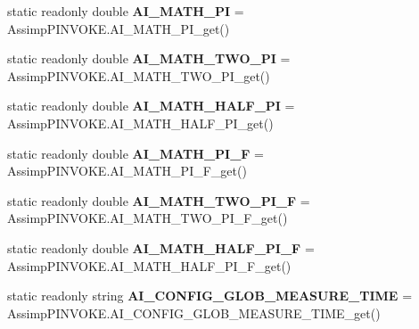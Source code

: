 \begin{DoxyCompactItemize}
\item 
\hypertarget{class_assimp_a6f3351386aca5512768ecf4adff6d544}{static readonly double {\bfseries A\+I\+\_\+\+M\+A\+T\+H\+\_\+\+P\+I} = Assimp\+P\+I\+N\+V\+O\+K\+E.\+A\+I\+\_\+\+M\+A\+T\+H\+\_\+\+P\+I\+\_\+get()}\label{class_assimp_a6f3351386aca5512768ecf4adff6d544}

\item 
\hypertarget{class_assimp_ac58777c0b131a7e12ca4f1249916a5f9}{static readonly double {\bfseries A\+I\+\_\+\+M\+A\+T\+H\+\_\+\+T\+W\+O\+\_\+\+P\+I} = Assimp\+P\+I\+N\+V\+O\+K\+E.\+A\+I\+\_\+\+M\+A\+T\+H\+\_\+\+T\+W\+O\+\_\+\+P\+I\+\_\+get()}\label{class_assimp_ac58777c0b131a7e12ca4f1249916a5f9}

\item 
\hypertarget{class_assimp_a78405f9c4e1cc3b9eb8d9beebdd061a5}{static readonly double {\bfseries A\+I\+\_\+\+M\+A\+T\+H\+\_\+\+H\+A\+L\+F\+\_\+\+P\+I} = Assimp\+P\+I\+N\+V\+O\+K\+E.\+A\+I\+\_\+\+M\+A\+T\+H\+\_\+\+H\+A\+L\+F\+\_\+\+P\+I\+\_\+get()}\label{class_assimp_a78405f9c4e1cc3b9eb8d9beebdd061a5}

\item 
\hypertarget{class_assimp_a04fb4ea955a66cbf492415cf05b0f199}{static readonly double {\bfseries A\+I\+\_\+\+M\+A\+T\+H\+\_\+\+P\+I\+\_\+\+F} = Assimp\+P\+I\+N\+V\+O\+K\+E.\+A\+I\+\_\+\+M\+A\+T\+H\+\_\+\+P\+I\+\_\+\+F\+\_\+get()}\label{class_assimp_a04fb4ea955a66cbf492415cf05b0f199}

\item 
\hypertarget{class_assimp_a6d672e7a88396ac42f4b304a0f2b2cb7}{static readonly double {\bfseries A\+I\+\_\+\+M\+A\+T\+H\+\_\+\+T\+W\+O\+\_\+\+P\+I\+\_\+\+F} = Assimp\+P\+I\+N\+V\+O\+K\+E.\+A\+I\+\_\+\+M\+A\+T\+H\+\_\+\+T\+W\+O\+\_\+\+P\+I\+\_\+\+F\+\_\+get()}\label{class_assimp_a6d672e7a88396ac42f4b304a0f2b2cb7}

\item 
\hypertarget{class_assimp_a4ef13dbcd474bfefb4e90efbd5c824f7}{static readonly double {\bfseries A\+I\+\_\+\+M\+A\+T\+H\+\_\+\+H\+A\+L\+F\+\_\+\+P\+I\+\_\+\+F} = Assimp\+P\+I\+N\+V\+O\+K\+E.\+A\+I\+\_\+\+M\+A\+T\+H\+\_\+\+H\+A\+L\+F\+\_\+\+P\+I\+\_\+\+F\+\_\+get()}\label{class_assimp_a4ef13dbcd474bfefb4e90efbd5c824f7}

\item 
\hypertarget{class_assimp_a14761b6f10933b1891c57e392ee316bd}{static readonly string {\bfseries A\+I\+\_\+\+C\+O\+N\+F\+I\+G\+\_\+\+G\+L\+O\+B\+\_\+\+M\+E\+A\+S\+U\+R\+E\+\_\+\+T\+I\+M\+E} = Assimp\+P\+I\+N\+V\+O\+K\+E.\+A\+I\+\_\+\+C\+O\+N\+F\+I\+G\+\_\+\+G\+L\+O\+B\+\_\+\+M\+E\+A\+S\+U\+R\+E\+\_\+\+T\+I\+M\+E\+\_\+get()}\label{class_assimp_a14761b6f10933b1891c57e392ee316bd}


\end{DoxyCompactItemize}
